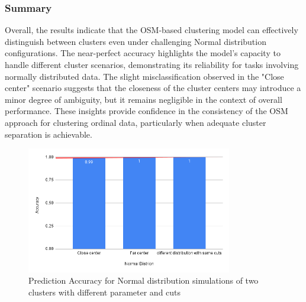 \documentclass{article}
\begin{document}
\subsubsection*{Summary}

Overall, the results indicate that the OSM-based clustering model can effectively distinguish between clusters even under challenging Normal distribution configurations. 
The near-perfect accuracy highlights the model's capacity to handle different cluster scenarios, demonstrating its reliability for tasks involving normally distributed data. 
The slight misclassification observed in the "Close center" scenario suggests that the closeness of the cluster centers may introduce a minor degree of ambiguity, but it remains negligible in the context of overall performance. 
These insights provide confidence in the consistency of the OSM approach for clustering ordinal data, particularly when adequate cluster separation is achievable.

\begin{figure}[htbp!]
  \centering
  \includegraphics[width=0.8\textwidth]{images/experiments/norm_dist.png}
  \caption{Prediction Accuracy for Normal distribution simulations of two clusters with different parameter and cuts}
  \label{fig:dist_acc}
\end{figure}
\end{document}

